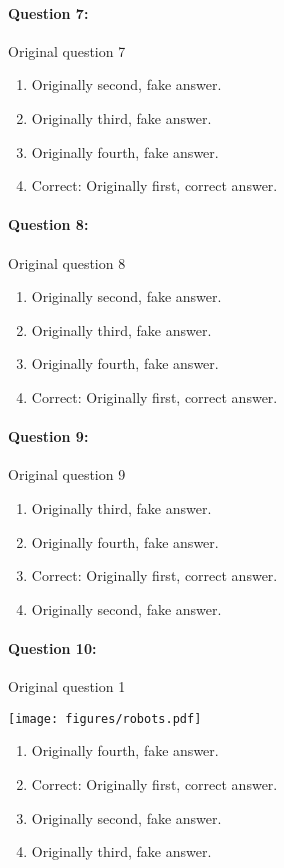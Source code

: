 \documentclass[9pt, twoside, twocolumn]{extarticle}
\renewcommand{\includegraphics}[2][]{\OldIncludegraphics[width=\linewidth, #1]{#2}}
\renewcommand{\caption}{}
\let\origfigure=\figure
\let\endorigfigure=\endfigure
\renewenvironment{figure}[1][]{%
  \origfigure[H]
}{%
  \endorigfigure
}
\begin{document}
\paragraph{Question 7:}
Original question 7

\begin{enumerate}[label=\textbf{{\Alph*}},labelindent=0pt, labelsep=1.5em, parsep=0.2em]
\item Originally second, fake answer.
\item Originally third, fake answer.
\item Originally fourth, fake answer.
\item Correct: Originally first, correct answer.
\end{enumerate}
\paragraph{Question 8:}
Original question 8

\begin{enumerate}[label=\textbf{{\Alph*}},labelindent=0pt, labelsep=1.5em, parsep=0.2em]
\item Originally second, fake answer.
\item Originally third, fake answer.
\item Originally fourth, fake answer.
\item Correct: Originally first, correct answer.
\end{enumerate}
\paragraph{Question 9:}
Original question 9

\begin{enumerate}[label=\textbf{{\Alph*}},labelindent=0pt, labelsep=1.5em, parsep=0.2em]
\item Originally third, fake answer.
\item Originally fourth, fake answer.
\item Correct: Originally first, correct answer.
\item Originally second, fake answer.
\end{enumerate}
\paragraph{Question 10:}
Original question 1

\begin{figure}\centering
\texttt{[image: figures/robots.pdf]}
\caption{\end{figure}
\begin{enumerate}[label=\textbf{{\Alph*}},labelindent=0pt, labelsep=1.5em, parsep=0.2em]
\item Originally fourth, fake answer.
\item Correct: Originally first, correct answer.
\item Originally second, fake answer.
\item Originally third, fake answer.
\end{enumerate}
\cleardoublepage
\newpage
\end{document}
